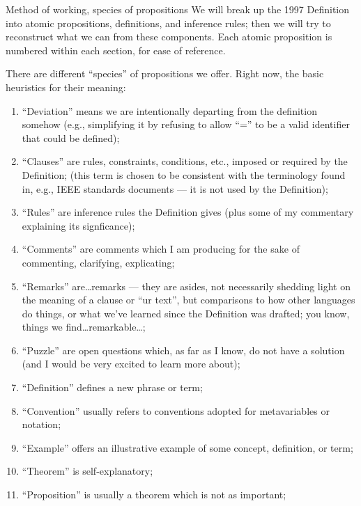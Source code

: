 \begin{remark}{Method of working, species of propositions}
We will break up the 1997 Definition into atomic propositions,
definitions, and inference rules; then we will try to reconstruct what
we can from these components. Each atomic proposition is numbered within
each section, for ease of reference.

There are different ``species'' of propositions we offer. Right now, the
basic heuristics for their meaning:
\begin{enumerate}
\item ``Deviation'' means we are intentionally departing from the
  definition somehow (e.g., simplifying it by refusing to allow ``='' to
  be a valid identifier that could be defined);
\item ``Clauses'' are rules, constraints, conditions, etc., imposed or
  required by the Definition; (this term is chosen to be consistent with
  the terminology found in, e.g., IEEE standards documents --- it is not
  used by the Definition);
\item ``Rules'' are inference rules the Definition gives (plus some of my
  commentary explaining its signficance);
\item ``Comments'' are comments which I am producing for the sake of
  commenting, clarifying, explicating;
\item ``Remarks'' are\dots remarks --- they are asides, not necessarily
  shedding light on the meaning of a clause or ``ur text'', but
  comparisons to how other languages do things, or what we've learned
  since the Definition was drafted; you know, things we find\dots remarkable\dots;
\item ``Puzzle'' are open questions which, as far as I know, do not have
  a solution (and I would be very excited to learn more about);
\item ``Definition'' defines a new phrase or term;
\item ``Convention'' usually refers to conventions adopted for
  metavariables or notation;
\item ``Example'' offers an illustrative example of some concept,
  definition, or term;
\item ``Theorem'' is self-explanatory;
\item ``Proposition'' is usually a theorem which is not as important;
\end{enumerate}
\end{remark}

